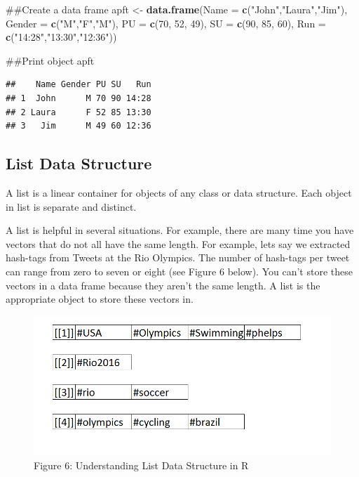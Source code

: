 \documentclass[]{book}
\newenvironment{Shaded}{\begin{snugshade}}{\end{snugshade}}
\newcommand{\KeywordTok}[1]{\textcolor[rgb]{0.13,0.29,0.53}{\textbf{{#1}}}}
\newcommand{\DataTypeTok}[1]{\textcolor[rgb]{0.13,0.29,0.53}{{#1}}}
\newcommand{\DecValTok}[1]{\textcolor[rgb]{0.00,0.00,0.81}{{#1}}}
\newcommand{\StringTok}[1]{\textcolor[rgb]{0.31,0.60,0.02}{{#1}}}
\newcommand{\NormalTok}[1]{{#1}}
\begin{document}
\begin{Shaded}
\begin{Highlighting}[]
\NormalTok{##Create a data frame}
\NormalTok{apft <-}\StringTok{ }\KeywordTok{data.frame}\NormalTok{(}\DataTypeTok{Name =} \KeywordTok{c}\NormalTok{(}\StringTok{"John"}\NormalTok{,}\StringTok{"Laura"}\NormalTok{,}\StringTok{"Jim"}\NormalTok{),}
                   \DataTypeTok{Gender =} \KeywordTok{c}\NormalTok{(}\StringTok{"M"}\NormalTok{,}\StringTok{"F"}\NormalTok{,}\StringTok{"M"}\NormalTok{),}
                   \DataTypeTok{PU =} \KeywordTok{c}\NormalTok{(}\DecValTok{70}\NormalTok{, }\DecValTok{52}\NormalTok{, }\DecValTok{49}\NormalTok{),}
                   \DataTypeTok{SU =} \KeywordTok{c}\NormalTok{(}\DecValTok{90}\NormalTok{, }\DecValTok{85}\NormalTok{, }\DecValTok{60}\NormalTok{),}
                   \DataTypeTok{Run =} \KeywordTok{c}\NormalTok{(}\StringTok{"14:28"}\NormalTok{,}\StringTok{"13:30"}\NormalTok{,}\StringTok{"12:36"}\NormalTok{))}

\NormalTok{##Print object}
\NormalTok{apft}
\end{Highlighting}
\end{Shaded}

\begin{verbatim}
##    Name Gender PU SU   Run
## 1  John      M 70 90 14:28
## 2 Laura      F 52 85 13:30
## 3   Jim      M 49 60 12:36
\end{verbatim}

\subsection{List Data Structure}\label{list-data-structure}

A list is a linear container for objects of any class or data structure.
Each object in list is separate and distinct.

A list is helpful in several situations. For example, there are many
time you have vectors that do not all have the same length. For example,
lets say we extracted hash-tags from Tweets at the Rio Olympics. The
number of hash-tags per tweet can range from zero to seven or eight (see
Figure 6 below). You can't store these vectors in a data frame because
they aren't the same length. A list is the appropriate object to store
these vectors in.

\begin{figure}[htbp]
\centering
\includegraphics{list.PNG}
\caption{Figure 6: Understanding List Data Structure in R}
\end{figure}
\end{document}
